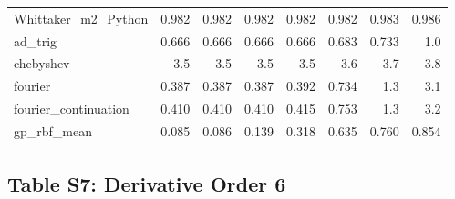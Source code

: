 \documentclass[10pt]{article}
\begin{document}
\begin{longtable}{lrrrrrrr}
Whittaker\_m2\_Python & 0.982 & 0.982 & 0.982 & 0.982 & 0.982 & 0.983 & 0.986 \\
ad\_trig & 0.666 & 0.666 & 0.666 & 0.666 & 0.683 & 0.733 & 1.0 \\
chebyshev & 3.5 & 3.5 & 3.5 & 3.5 & 3.6 & 3.7 & 3.8 \\
fourier & 0.387 & 0.387 & 0.387 & 0.392 & 0.734 & 1.3 & 3.1 \\
fourier\_continuation & 0.410 & 0.410 & 0.410 & 0.415 & 0.753 & 1.3 & 3.2 \\
gp\_rbf\_mean & 0.085 & 0.086 & 0.139 & 0.318 & 0.635 & 0.760 & 0.854 \\
\bottomrule
\end{longtable}

\clearpage

\subsection*{Table S7: Derivative Order 6}
\end{document}
